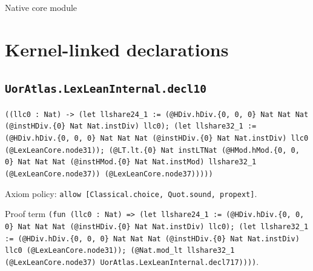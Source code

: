 \documentclass[11pt]{article}
\begin{document}
\begin{center}{\LARGE Native core module}\end{center}
\section*{Kernel-linked declarations}
\subsection*{\texttt{UorAtlas.LexLeanInternal.decl10}}
\noindent\texttt{((llc0 : Nat) -> (let llshare24\_1 := (@HDiv.hDiv.\{0, 0, 0\} Nat Nat Nat (@instHDiv.\{0\} Nat Nat.instDiv) llc0); (let llshare32\_1 := (@HDiv.hDiv.\{0, 0, 0\} Nat Nat Nat (@instHDiv.\{0\} Nat Nat.instDiv) llc0 (@LexLeanCore.node31)); (@LT.lt.\{0\} Nat instLTNat (@HMod.hMod.\{0, 0, 0\} Nat Nat Nat (@instHMod.\{0\} Nat Nat.instMod) llshare32\_1 (@LexLeanCore.node37)) (@LexLeanCore.node37)))))}\par
\noindent Axiom policy: \texttt{allow [Classical.choice, Quot.sound, propext]}.\par
\noindent Proof term \texttt{(fun (llc0 : Nat) => (let llshare24\_1 := (@HDiv.hDiv.\{0, 0, 0\} Nat Nat Nat (@instHDiv.\{0\} Nat Nat.instDiv) llc0); (let llshare32\_1 := (@HDiv.hDiv.\{0, 0, 0\} Nat Nat Nat (@instHDiv.\{0\} Nat Nat.instDiv) llc0 (@LexLeanCore.node31)); (@Nat.mod\_lt llshare32\_1 (@LexLeanCore.node37) UorAtlas.LexLeanInternal.decl717))))}.\par
\end{document}
